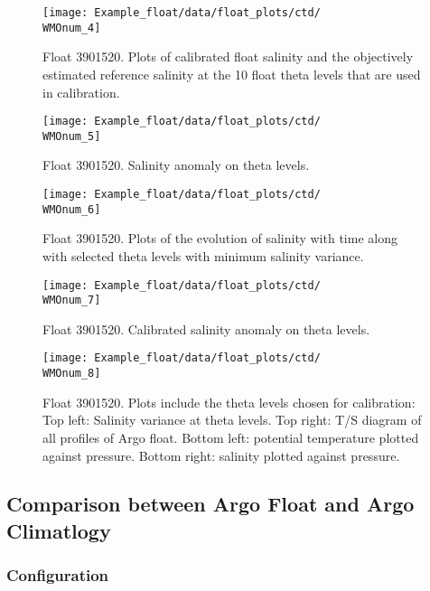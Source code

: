 \documentclass{article}
\newcommand{\WMOnum}{3901520} %
\begin{document}
\begin{flushleft}
\begin{figure}[H]
    \centering    
    \texttt{[image: Example\_float/data/float\_plots/ctd/\\WMOnum\_4]}
    \caption{Float \WMOnum. Plots of calibrated float salinity and the objectively estimated reference salinity at the 10 float theta levels that are used in calibration.}
    \label{CalibVsSalinity}
\end{figure}

\begin{figure}[H]
    \centering    
    \texttt{[image: Example\_float/data/float\_plots/ctd/\\WMOnum\_5]}
    \caption{Float \WMOnum. Salinity anomaly on theta levels.}
    \label{SalAnomOnTheta}
\end{figure}

\newpage
\begin{figure}[H]
    \centering    
    \texttt{[image: Example\_float/data/float\_plots/ctd/\\WMOnum\_6]}
    \caption{Float \WMOnum. Plots of the evolution of salinity with time along with selected theta levels with minimum salinity variance.}
    \label{SalErrOnTheta}
\end{figure}

\begin{figure}[H]
    \centering    
    \texttt{[image: Example\_float/data/float\_plots/ctd/\\WMOnum\_7]}
    \caption{Float \WMOnum.  Calibrated salinity anomaly on theta levels.}
    \label{CalibSalAnomOnTheta}
\end{figure}

\begin{figure}[H]
    \centering    
    \texttt{[image: Example\_float/data/float\_plots/ctd/\\WMOnum\_8]}
    \caption{Float \WMOnum. Plots include the theta levels chosen for calibration: Top left: Salinity variance at theta levels. Top right: T/S diagram of all profiles of Argo float. Bottom left: potential temperature plotted against pressure. Bottom right: salinity plotted against pressure.}
    \label{Salinity_OWlevels}
\end{figure}
\newpage
\subsection{Comparison between Argo Float and Argo Climatlogy}
\subsubsection{Configuration}
\label{Configuration2}
%



\end{flushleft}
\end{document}
